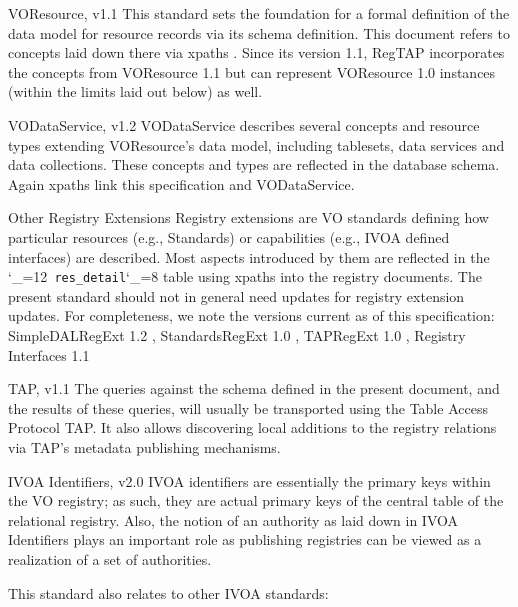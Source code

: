 \documentclass[11pt,a4paper]{ivoa}
\makeatletter
\def\rtent#1{\texttt{\color{rtcolor}\verb|#1|}}
\def\makeunderscoreletter{\catcode`\_=12}
\def\makeunderscoresubscript{\catcode`\_=8}
\def\rtent{\makeunderscoreletter\relax\rt@nt}
\def\rt@nt#1{\texttt{\color{rtcolor} #1}\makeunderscoresubscript{}}
\makeatother
\begin{document}
\begin{bigdescription}
\item[VOResource, v1.1 \citep{2018ivoa.spec.0625P}] This standard
sets the foundation for a formal definition of the data
model for resource records via its schema definition.  This document
refers to concepts laid down there via xpaths \citep{std:XPATH}.  Since
its version 1.1, RegTAP
incorporates the concepts from VOResource 1.1 but can represent
VOResource 1.0 instances (within the limits laid out below) as well.
\item[VODataService, v1.2 \citep{2021ivoa.spec.1102D}] VODataService
de\-scribes several concepts and resource types extending
VOResource's data model, including
tablesets, data services and data
collections.  These concepts and types are reflected in the database
schema.  Again xpaths link this specification and VODataService.
\item[Other Registry Extensions]Registry extensions are VO standards
defining how particular resources (e.g., Standards) or capabilities
(e.g., IVOA defined interfaces) are described.  Most aspects
introduced by them are reflected in the \rtent{res_detail} table using
xpaths into the registry documents.
The present standard should not in general need updates
for registry extension updates.  For completeness, we note the
versions current as of this specification: SimpleDALRegExt 1.2
\citep{2022ivoa.spec.0222D},
StandardsRegExt 1.0 \citep{2012ivoa.spec.0508H}, TAPRegExt 1.0
\citep{2012ivoa.spec.0827D}, Registry Interfaces 1.1
\citep{2018ivoa.spec.0723D}
\item[TAP, v1.1 \citep{2019ivoa.spec.0927D}]
The queries against the schema defined in the present document, and the results of
these queries, will usually be transported using the Table Access
Protocol TAP.  It also allows discovering
local additions to the registry relations via TAP's metadata publishing
mechanisms.
\item[IVOA Identifiers, v2.0 \citep{2016ivoa.spec.0523D}]IVOA identifiers are
essentially the primary keys within the VO
registry; as such, they are actual primary keys of the central table of
the relational registry. Also, the notion of an authority as laid down
in IVOA Identifiers plays an important role as publishing registries can
be viewed as a realization of a set of authorities.

\end{bigdescription}

This standard also relates to other IVOA standards:
\end{document}
